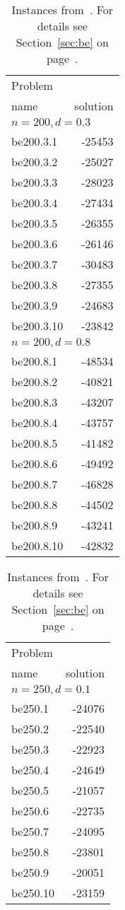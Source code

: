\documentclass[a4paper, 12pt]{article}
\begin{document}
\begin{table}
\begin{center}
\begin{minipage}{30ex}
\begin{tabular}{|l|r|}
\hline
Problem & \\
name & solution \\
\hline
\hline
\multicolumn{2}{|l|}{$n=200, d=0.3$}\\
\hline
be200.3.1  & -25453 \\
be200.3.2  & -25027 \\
be200.3.3  & -28023 \\
be200.3.4  & -27434 \\
be200.3.5  & -26355 \\
be200.3.6  & -26146 \\
be200.3.7  & -30483 \\
be200.3.8  & -27355 \\
be200.3.9  & -24683 \\
be200.3.10 & -23842 \\
\hline
\multicolumn{2}{|l|}{$n=200, d=0.8$}\\
\hline
be200.8.1  & -48534 \\
be200.8.2  & -40821 \\
be200.8.3  & -43207 \\
be200.8.4  & -43757 \\
be200.8.5  & -41482 \\
be200.8.6  & -49492 \\
be200.8.7  & -46828 \\
be200.8.8  & -44502 \\
be200.8.9  & -43241 \\
be200.8.10 & -42832 \\
\hline
\end{tabular}
\end{minipage}
\begin{minipage}{30ex}
\begin{tabular}{|l|r|}
\hline
Problem & \\
name & solution\\
\hline
\multicolumn{2}{|l|}{$n=250, d=0.1$}\\
\hline
be250.1 & -24076 \\
be250.2 & -22540 \\
be250.3 & -22923 \\
be250.4 & -24649 \\
be250.5 & -21057 \\
be250.6 & -22735 \\
be250.7 & -24095 \\
be250.8 & -23801 \\
be250.9 & -20051 \\
be250.10 & -23159 \\
\hline
\end{tabular}
\end{minipage}
\caption{Instances from~\cite{BiEl:07}. For details
  see Section~\ref{sec:be} on page~\pageref{sec:be}.} \label{tab:be2} 
\end{center}
\end{table}
\end{document}

